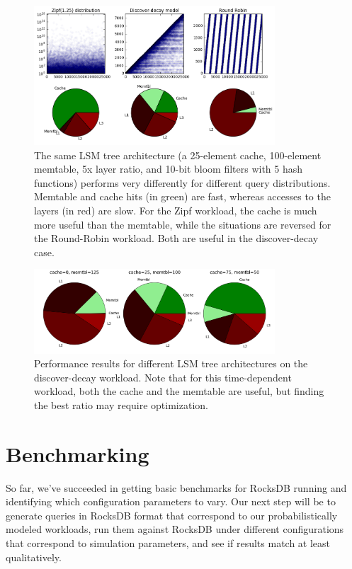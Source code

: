 \documentclass{sig-alternate-05-2015}
\begin{document}
\begin{figure}[!htb]
\begin{center}
\includegraphics[width=9cm]{sametree-diffqs.png}
\end{center}
\caption{The same LSM tree architecture (a 25-element cache, 100-element
memtable, 5x layer ratio, and 10-bit bloom filters with 5 hash functions)
performs very differently for different query distributions. Memtable and cache
hits (in green) are fast, whereas accesses to the layers (in red) are slow. For
the Zipf workload, the cache is much more useful than the memtable, while the
situations are reversed for the Round-Robin workload. Both are useful in the
discover-decay case.}
\label{fig:sametree-diffqs}
\end{figure}

\begin{figure}[!htb]
\begin{center}
\includegraphics[width=9cm]{sameqs-difftree.png}
\end{center}
\caption{Performance results for different LSM tree architectures on the
discover-decay workload. Note that for this time-dependent workload, both the
cache and the memtable are useful, but finding the best ratio may require
optimization.}
\label{fig:sameqs-difftree}
\end{figure}

\section{Benchmarking}

So far, we've succeeded in getting basic benchmarks for RocksDB running and
identifying which configuration parameters to vary. Our next step will be
to generate queries in RocksDB format that correspond to our probabilistically
modeled workloads, run them against RocksDB under different configurations
that correspond to simulation parameters, and see if results match at least
qualitatively.
\end{document}
